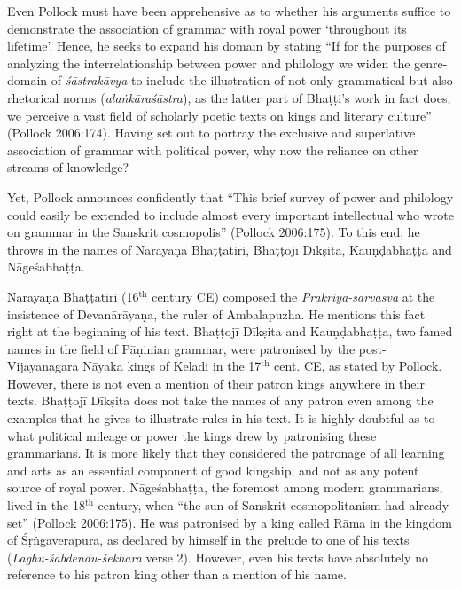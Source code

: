 Even Pollock must have been apprehensive as to whether his arguments suffice to demonstrate the association of grammar with royal power `throughout its lifetime'. Hence, he seeks to expand his domain by stating ``If for the purposes of analyzing the interrelationship between power and philology we widen the genre-domain of {\sl śāstrakāvya} to include the illustration of not only grammatical but also rhetorical norms ({\sl alaṅkāraśāstra}), as the latter part of Bhaṭṭi's work in fact does, we perceive a vast field of scholarly poetic texts on kings and literary culture'' (Pollock 2006:174). Having set out to portray the exclusive and superlative association of grammar with political power, why now the reliance on other streams of knowledge?

Yet, Pollock announces confidently that ``This brief survey of power and philology could easily be extended to include almost every important intellectual who wrote on grammar in the Sanskrit cosmopolis'' (Pollock 2006:175). To this end, he throws in the names of Nārāyaṇa Bhaṭṭatiri, Bhaṭṭojī Dīkṣita, Kauṇḍabhaṭṭa and Nāgeśabhaṭṭa.

Nārāyaṇa Bhaṭṭatiri (16$^{\text{th}}$ century CE) composed the {\sl Prakriyā-sarvasva} at the insistence of Devanārāyaṇa, the ruler of Ambalapuzha. He mentions this fact right at the beginning of his text. Bhaṭṭojī Dīkṣita and Kauṇḍabhaṭṭa, two famed names in the field of Pāṇinian grammar, were patronised by the post-Vijayanagara Nāyaka kings of Keladi in the 17$^{\text{th}}$ cent. CE, as stated by Pollock. However, there is not even a mention of their patron kings anywhere in their texts. Bhaṭṭojī Dīkṣita does not take the names of any patron even among the examples that he gives to illustrate rules in his text. It is highly doubtful as to what political mileage or power the kings drew by patronising these grammarians. It is more likely that they considered the patronage of all learning and arts as an essential component of good kingship, and not as any potent source of royal power. Nāgeśabhaṭṭa, the foremost among modern grammarians, lived in the 18$^{\text{th}}$ century, when ``the sun of Sanskrit cosmopolitanism had already set'' (Pollock 2006:175). He was patronised by a king called Rāma in the kingdom of Śṛṅgaverapura, as declared by himself in the prelude to one of his texts ({\sl Laghu-śabdendu-śekhara} verse 2). However, even his texts have absolutely no reference to his patron king other than a mention of his name. 


